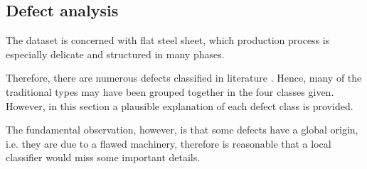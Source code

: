     \subsection{Defect analysis}\label{subsection:defects}
        \par{
            The dataset is concerned with flat steel sheet, which production process is especially delicate and structured in many phases.
        }
        \par{
            Therefore, there are numerous defects classified in literature \cite{defects:64common,defects:mainlinemetals}. Hence, many of the traditional types may have been grouped together in the four classes given. However, in this section a plausible explanation of each defect class is provided.
        }
        \par{
            The fundamental observation, however, is that some defects have a global origin, i.e. they are due to a flawed machinery, therefore is reasonable that a local classifier would miss some important details.
        }

